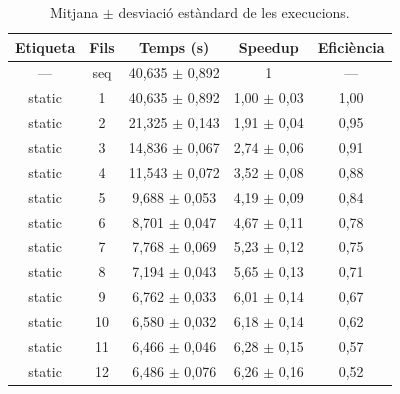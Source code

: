 \begin{table}[H]
\centering
\begin{tabular}{|c|c|c|c|c|}
\hline
\textbf{Etiqueta} & \textbf{Fils} & \textbf{Temps (s)} & \textbf{Speedup} & \textbf{Eficiència} \\ \hline
--- & seq & 40,635 $\pm$ 0,892 & 1 & --- \\ \hline
static & 1 & 40,635 $\pm$ 0,892 & 1,00 $\pm$ 0,03 & 1,00 \\ \hline
static & 2 & 21,325 $\pm$ 0,143 & 1,91 $\pm$ 0,04 & 0,95 \\ \hline
static & 3 & 14,836 $\pm$ 0,067 & 2,74 $\pm$ 0,06 & 0,91 \\ \hline
static & 4 & 11,543 $\pm$ 0,072 & 3,52 $\pm$ 0,08 & 0,88 \\ \hline
static & 5 & 9,688 $\pm$ 0,053 & 4,19 $\pm$ 0,09 & 0,84 \\ \hline
static & 6 & 8,701 $\pm$ 0,047 & 4,67 $\pm$ 0,11 & 0,78 \\ \hline
static & 7 & 7,768 $\pm$ 0,069 & 5,23 $\pm$ 0,12 & 0,75 \\ \hline
static & 8 & 7,194 $\pm$ 0,043 & 5,65 $\pm$ 0,13 & 0,71 \\ \hline
static & 9 & 6,762 $\pm$ 0,033 & 6,01 $\pm$ 0,14 & 0,67 \\ \hline
static & 10 & 6,580 $\pm$ 0,032 & 6,18 $\pm$ 0,14 & 0,62 \\ \hline
static & 11 & 6,466 $\pm$ 0,046 & 6,28 $\pm$ 0,15 & 0,57 \\ \hline
static & 12 & 6,486 $\pm$ 0,076 & 6,26 $\pm$ 0,16 & 0,52 \\ \hline
\end{tabular}
\caption{Mitjana $\pm$ desviació estàndard de les execucions.}
\label{tab:resultats}
\end{table}
